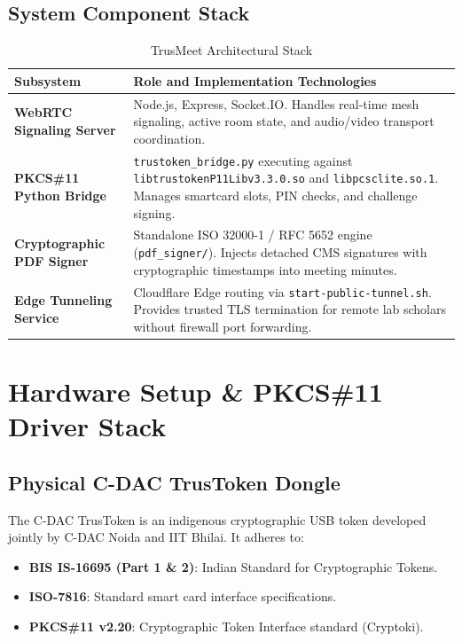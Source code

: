 \documentclass[11pt,a4paper]{report}
\begin{document}
\section{System Component Stack}
\begin{table}[h!]
\centering
\small
\begin{tabularx}{\textwidth}{lX}
\toprule
\textbf{Subsystem} & \textbf{Role and Implementation Technologies} \\
\midrule
\textbf{WebRTC Signaling Server} & Node.js, Express, Socket.IO. Handles real-time mesh signaling, active room state, and audio/video transport coordination. \\
\textbf{PKCS\#11 Python Bridge} & \texttt{trustoken\_bridge.py} executing against \texttt{libtrustokenP11Libv3.3.0.so} and \texttt{libpcsclite.so.1}. Manages smartcard slots, PIN checks, and challenge signing. \\
\textbf{Cryptographic PDF Signer} & Standalone ISO 32000-1 / RFC 5652 engine (\texttt{pdf\_signer/}). Injects detached CMS signatures with cryptographic timestamps into meeting minutes. \\
\textbf{Edge Tunneling Service} & Cloudflare Edge routing via \texttt{start-public-tunnel.sh}. Provides trusted TLS termination for remote lab scholars without firewall port forwarding. \\
\bottomrule
\end{tabularx}
\caption{TrusMeet Architectural Stack}
\end{table}

\newpage
\chapter{Hardware Setup \& PKCS\#11 Driver Stack}

\section{Physical C-DAC TrusToken Dongle}
The C-DAC TrusToken is an indigenous cryptographic USB token developed jointly by C-DAC Noida and IIT Bhilai. It adheres to:
\begin{itemize}[noitemsep]
    \item \textbf{BIS IS-16695 (Part 1 \& 2)}: Indian Standard for Cryptographic Tokens.
    \item \textbf{ISO-7816}: Standard smart card interface specifications.
    \item \textbf{PKCS\#11 v2.20}: Cryptographic Token Interface standard (Cryptoki).
\end{itemize}
\end{document}
